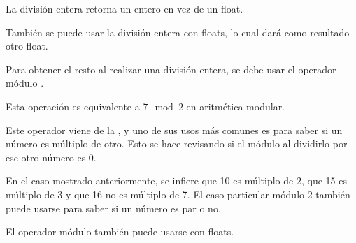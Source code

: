 La división entera retorna un entero en vez de un float.


También se puede usar la división entera con floats, lo cual dará como resultado otro float.


Para obtener el resto al realizar una división entera, se debe usar el operador módulo \ttt{\%}.


Esta operación es equivalente a $7 \mod{2}$ en aritmética modular.\smallskip

Este operador viene de la , y uno de sus usos más comunes es para saber si un número es múltiplo de otro. Esto se hace revisando si el módulo al dividirlo por ese otro número es 0.


En el caso mostrado anteriormente, se infiere que 10 es múltiplo de 2, que 15 es múltiplo de 3 y que 16 no es múltiplo de 7. El caso particular módulo 2 también puede usarse para saber si un número es par o no.\smallskip

El operador módulo \ttt{\%} también puede usarse con floats.


\clearpage